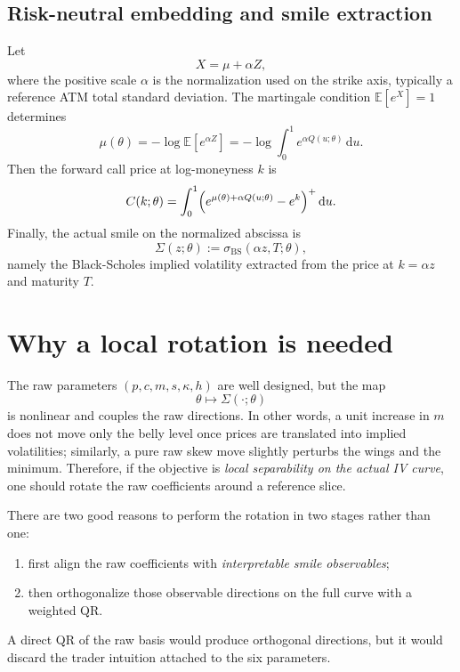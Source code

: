 \documentclass[11pt]{article}
\newcommand{\E}{\mathbb{E}}
\newcommand{\dd}{\mathrm{d}}
\newcommand{\Sig}{\Sigma}
\newcommand{\iv}{\sigma_{\mathrm{BS}}}
\begin{document}
\subsection{Risk-neutral embedding and smile extraction}
Let
\[
X = \mu + \alpha Z,
\]
where the positive scale $\alpha$ is the normalization used on the strike axis, typically a reference ATM total standard deviation. The martingale condition $\E[e^X]=1$ determines
\begin{equation}
\mu(\theta)
= -\log \E\left[e^{\alpha Z}\right]
= -\log\int_0^1 e^{\alpha Q(u;\theta)}\,\dd u.
\label{eq:martingale-shift}
\end{equation}
Then the forward call price at log-moneyness $k$ is
\begin{equation}
C(k;\theta)
= \int_0^1 \Bigl(e^{\mu(\theta)+\alpha Q(u;\theta)} - e^k\Bigr)^+\,\dd u.
\label{eq:call-price}
\end{equation}
Finally, the actual smile on the normalized abscissa is
\begin{equation}
\Sig(z;\theta) := \iv(\alpha z, T; \theta),
\label{eq:smile-map}
\end{equation}
namely the Black-Scholes implied volatility extracted from the price at $k = \alpha z$ and maturity $T$.

\section{Why a local rotation is needed}
The raw parameters $(p,c,m,s,\kappa,h)$ are well designed, but the map
\[
\theta \longmapsto \Sig(\cdot;\theta)
\]
is nonlinear and couples the raw directions. In other words, a unit increase in $m$ does not move only the belly level once prices are translated into implied volatilities; similarly, a pure raw skew move slightly perturbs the wings and the minimum. Therefore, if the objective is \emph{local separability on the actual IV curve}, one should rotate the raw coefficients around a reference slice.

There are two good reasons to perform the rotation in two stages rather than one:
\begin{enumerate}[leftmargin=2.2em]
\item first align the raw coefficients with \emph{interpretable smile observables};
\item then orthogonalize those observable directions on the full curve with a weighted QR.
\end{enumerate}
A direct QR of the raw basis would produce orthogonal directions, but it would discard the trader intuition attached to the six parameters.
\end{document}
